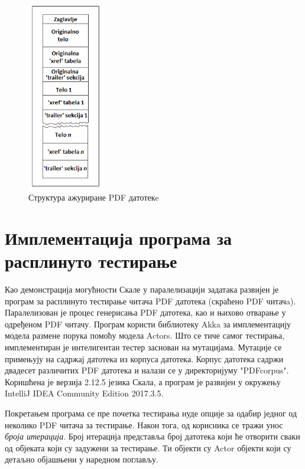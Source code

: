 \documentclass[12pt,oneside]{memoir}
\begin{document}
\begin{figure}[t!]
\centering
\includegraphics[width=0.3\textwidth]{pdfStruktura2.png}
\caption{Структура ажуриране PDF датотекe}
\label{fig:pdfStruktura2}
\end{figure}

\chapter{Имплементација програма за расплинуто тестирање}

Као демонстрација могућности Скале у паралелизацији задатака развијен је програм за расплинуто тестирање читача PDF датотека (скраћено PDF читачa). Паралелизован је процес генерисања PDF датотека, као и њихово отварање у одређеном PDF читачу. Програм користи библиотеку Akka за имплементацију модела размене порука помоћу модела Actors. Што се тиче самог тестирања, имплементиран је интелигентан тестер заснован на мутацијама. Мутације се примењују на садржај датотека из корпуса датотека. Корпус датотека садржи двадесет различитих PDF датотека и налази се у директоријуму "PDFcorpus". Коришћена је верзија 2.12.5 језика Скала, а програм је развијен у окружењу IntelliJ IDEA Community Edition 2017.3.5. 

Покретањем програма се пре почетка тестирања нуде опције за одабир једног од неколико PDF читача за тестирање. Након тога, од корисника се тражи унос \textit{броја итерација}. Број итерација представља број датотека који ће отворити сваки од објеката који су задужени за тестирање. Ти објекти су Actor објекти  који су детаљно објашњени у наредном поглављу. %
\end{document}
